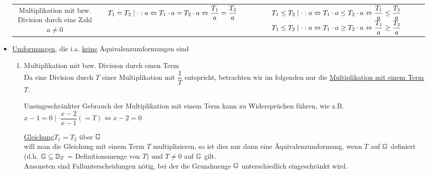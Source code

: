 \begin{itemize}
\begin{longtable}{c|c|c}
		\parbox{0.25\linewidth}{\vspace{2em}Multiplikation mit bzw. Division durch eine Zahl $a\ne0$\vspace{2em}} &
		\parbox{0.25\linewidth}{\vspace{2em}${\color{white}\Leftrightarrow}T_1 = T_2\mid\cdot: a\\\Leftrightarrow T_1\cdot a = T_2\cdot a\\\Leftrightarrow \dfrac{T_1}{a} = \dfrac{T_2}{a}$\vspace{2em}} &
		\parbox{0.25\linewidth}{\vspace{2em}\\${\color{white}\Leftrightarrow}T_1 \le T_2\mid\cdot: a\\\Leftrightarrow T_1\cdot a \le T_2\cdot a\\\Leftrightarrow \dfrac{T_1}{a} \le \dfrac{T_2}{a}$\vspace{2em}}
		\parbox{0.25\linewidth}{\vspace{2em}\\${\color{white}\Leftrightarrow}T_1 \le T_2\mid\cdot: a\\\Leftrightarrow T_1\cdot a \ge T_2\cdot a\\\Leftrightarrow \dfrac{T_1}{a} \ge \dfrac{T_2}{a}$\vspace{2em}}\\
	\end{longtable}
	
	\clearpage
	\item \ul{Umformungen}, die i.a. \ul{keine} Äquivalenzumformungen sind
	\begin{enumerate}
		\item Multiplikation mit bzw. Division durch einen Term\\
		Da eine Division durch $T$ einer Multiplikation mit $\dfrac{1}{T}$ entspricht, betrachten wir im folgenden nur die \ul{Multiplikation mit einem Term $T$}.
		
		Uneingeschränkter Gebrauch der Multiplikation mit einem Term kann zu Widersprüchen führen, wie z.B. $x-1 = 0\mid \cdot \dfrac{x-2}{x-1}(=T)\Leftrightarrow x-2=0$ 
		
		\ul{Gleichung}\qquad $T_1=T_2$ \qquad über $\mathbb{G}$\\
		will man die Gleichung mit einem Term $T$ multiplizieren, so ist dies nur dann eine Äquivalenzumformung, wenn $T$ auf $\mathbb{G}$ definiert (d.h. $\mathbb{G}\subseteq\mathbb{D}_T$ = Definitionsmenge von $T$) und $T\ne0$ auf $\mathbb{G}$ gilt.\\
		Ansonsten sind Fallunterscheidungen nötig, bei der die Grundmenge $\mathbb{G}$ unterschiedlich eingeschränkt wird.
		

\end{enumerate}
\end{itemize}
